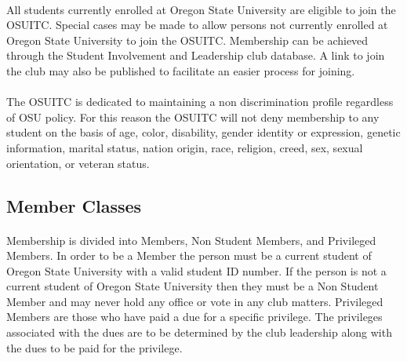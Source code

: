 \documentclass[12pt]{article}
\begin{document}
\paragraph{}
All students currently enrolled at Oregon State University are eligible to join the OSUITC. Special cases may be made to allow persons not currently enrolled at Oregon State University to join the OSUITC. Membership can be achieved through the Student Involvement and Leadership club database. A link to join the club may also be published to facilitate an easier process for joining.

\paragraph{}
The OSUITC is dedicated to maintaining a non discrimination profile regardless of OSU policy. For this reason the OSUITC will not deny membership to any student on the basis of age, color, disability, gender identity or expression, genetic information, marital status, nation origin, race, religion, creed,  sex, sexual orientation, or veteran status. 

\subsection{Member Classes}
\paragraph{}
Membership is divided into Members, Non Student Members, and Privileged Members. In order to be a Member the person must be a current student of Oregon State University with a valid student ID number.
If the person is not a current student of Oregon State University then they must be a Non Student Member and may never hold any office or vote in any club matters.
Privileged Members are those who have paid a due for a specific privilege. The privileges associated with the dues are to be determined by the club leadership along with the dues to be paid for the privilege.

\end{document}
